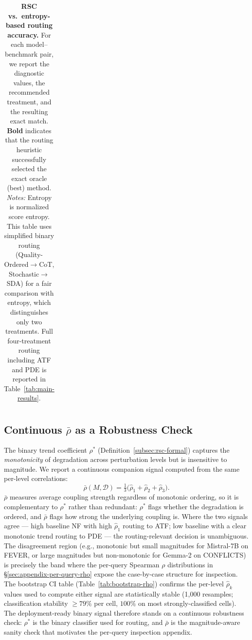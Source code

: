 \documentclass[11pt]{article}
\theoremstyle{definition}
\begin{document}
\begin{table}[t]
{\begin{tabular}{@{}l cc cc ccc@{}}
\bottomrule
\end{tabular}
}
\caption{\textbf{RSC vs.\ entropy-based routing accuracy.} For each model--benchmark pair, we report the diagnostic values, the recommended treatment, and the resulting exact match. \textbf{Bold} indicates that the routing heuristic successfully selected the exact oracle (best) method. \emph{Notes:} Entropy is normalized score entropy. This table uses simplified binary routing (Quality-Ordered\(\to\)CoT, Stochastic\(\to\)SDA) for a fair comparison with entropy, which distinguishes only two treatments. Full four-treatment routing including ATF and PDE is reported in Table~\ref{tab:main-results}.}
\label{tab:rsc-entropy-routing}
\end{table}

\subsection{Continuous \texorpdfstring{$\bar{\rho}$}{rho-bar} as a Robustness Check}
\label{sec:appendix-rho-bar}

The binary trend coefficient \(\rho^*\) (Definition~\ref{subsec:rsc-formal}) captures the \emph{monotonicity} of degradation across perturbation levels but is insensitive to magnitude. We report a continuous companion signal computed from the same per-level correlations:
\begin{equation}
\bar{\rho}(M, \mathcal{D}) = \tfrac{1}{3}\bigl(\hat{\rho}_1 + \hat{\rho}_2 + \hat{\rho}_3\bigr).
\label{eq:rho-bar}
\end{equation}
\(\bar{\rho}\) measures average coupling strength regardless of monotonic ordering, so it is complementary to \(\rho^*\) rather than redundant: \(\rho^*\) flags whether the degradation is ordered, and \(\bar{\rho}\) flags how strong the underlying coupling is. Where the two signals agree --- high baseline NF with high \(\hat{\rho}_1\) routing to ATF; low baseline with a clear monotonic trend routing to PDE --- the routing-relevant decision is unambiguous. The disagreement region (e.g., monotonic but small magnitudes for Mistral-7B on FEVER, or large magnitudes but non-monotonic for Gemma-2 on CONFLICTS) is precisely the band where the per-query Spearman \(\rho\) distributions in \S\ref{sec:appendix-per-query-rho} expose the case-by-case structure for inspection. The bootstrap CI table (Table~\ref{tab:bootstrap-rho}) confirms the per-level \(\hat{\rho}_k\) values used to compute either signal are statistically stable (1{,}000 resamples; classification stability \(\geq 79\%\) per cell, \(100\%\) on most strongly-classified cells). The deployment-ready binary signal therefore stands on a continuous robustness check: \(\rho^*\) is the binary classifier used for routing, and \(\bar{\rho}\) is the magnitude-aware sanity check that motivates the per-query inspection appendix.
\end{document}
